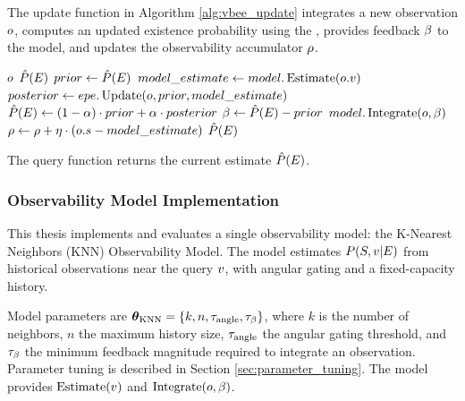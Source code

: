 The update function in Algorithm \ref{alg:vbee_update} integrates a new observation \(o\), computes an updated existence probability using the \epe{}, provides feedback \(\beta\) to the model, and updates the observability accumulator \(\rho\).

\begin{singlespace}
\begin{algorithm}[H]
    \caption[VBEE Update]{VBEE Update: $\vbee.\update{\observation}$}
    \label{alg:vbee_update}
    \begin{algorithmic}
        \Require $o$ 
        \Ensure $\hat{P}(E)$ 
        \State $prior \gets \hat{P}(E)$
        \State $model\_estimate \gets model.\operatorname{Estimate}(o.v)$ 
        \State $posterior \gets epe.\operatorname{Update}(o, prior, model\_estimate)$ 
        \State $\hat{P}(E) \gets (1-\alpha)\cdot prior + \alpha \cdot posterior$ 
        \State $\beta \gets \hat{P}(E) - prior$ 
        \State $model.\operatorname{Integrate}(o, \beta)$ 
        \State $\rho \gets \rho + \eta \cdot (o.s - model\_estimate)$ 
        \State \Return $\hat{P}(E)$
    \end{algorithmic}
\end{algorithm}
\end{singlespace}

The query function returns the current estimate \(\hat{P}(E)\).

\subsubsection{Observability Model Implementation}
\label{sec:observability_models}

This thesis implements and evaluates a single observability model: the K-Nearest Neighbors (KNN) Observability Model. The model estimates \(P(S,v|E)\) from historical observations near the query \(v\), with angular gating and a fixed-capacity history.

Model parameters are \(\boldsymbol{\theta}_{\text{KNN}} = \{k, n, \tau_{\text{angle}}, \tau_{\text{\ensuremath{\beta}}}\}\), where \(k\) is the number of neighbors, \(n\) the maximum history size, \(\tau_{\text{angle}}\) the angular gating threshold, and \(\tau_{\text{\ensuremath{\beta}}}\) the minimum feedback magnitude required to integrate an observation. Parameter tuning is described in Section \ref{sec:parameter_tuning}. The model provides \(\operatorname{Estimate}(v)\) and \(\operatorname{Integrate}(o,\beta)\).

